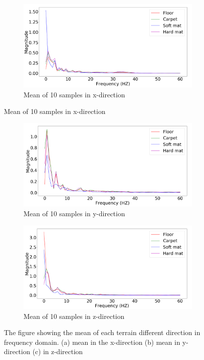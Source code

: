 \documentclass[USenglish]{ifimaster}  %
\begin{document}
\begin{figure}[h]
	\centering
	\begin{subfigure}[b]{0.95\textwidth}
		\includegraphics[width=1\linewidth]{Figures/fftx}
		\caption{Mean of 10 samples in x-direction}
		\label{fig:fftx} 
	\end{subfigure}
\end{figure}
\begin{figure}[h] \ContinuedFloat	
	\begin{subfigure}[b]{0.95\textwidth}
		\includegraphics[width=1\linewidth]{Figures/ffty}
		\caption{Mean of 10 samples in y-direction}
		\label{fig:ffty}
	\end{subfigure}
	
	
	\begin{subfigure}[h]{0.95\textwidth}
		\includegraphics[width=1\linewidth]{Figures/fftz}
		\caption{Mean of 10 samples in z-direction}
		\label{fig:fftz}
	\end{subfigure}
	
	\caption[]{The figure showing the mean of each terrain different direction in frequency domain. (a) mean in the x-direction (b) mean in y-direction (c) in z-direction}
	\label{fig:fftxyz}
\end{figure}
\FloatBarrier
\end{document}
